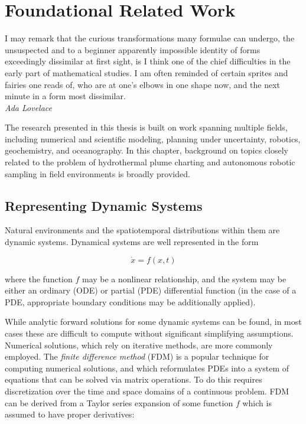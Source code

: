 \chapter{Foundational Related Work}
\label{chap:related_work}

\begin{center}
    \begin{minipage}{0.7\textwidth}
      \begin{small}
        I may remark that the curious transformations many formulae can undergo, the unsuspected and to a beginner apparently impossible identity of forms exceedingly dissimilar at first sight, is I think one of the chief difficulties in the early part of mathematical studies. I am often reminded of certain sprites and fairies one reads of, who are at one's elbows in one shape now, and the next minute in a form most dissimilar.\\ \emph{Ada Lovelace}
      \end{small}
    \end{minipage}
    \vspace{0.5cm}
\end{center}

The research presented in this thesis is built on work spanning multiple fields, including numerical and scientific modeling, planning under uncertainty, robotics, geochemistry, and oceanography. In this chapter, background on topics closely related to the problem of hydrothermal plume charting and autonomous robotic sampling in field environments is broadly provided.

\section{Representing Dynamic Systems}
\label{sec:dyn_sys}
Natural environments and the spatiotemporal distributions within them are dynamic systems.
Dynamical systems are well represented in the form

\begin{equation}
    \dot{x} = f(x,t)
\end{equation}

\noindent where the function $f$ may be a nonlinear relationship, and the system may be either an ordinary (ODE) or partial (PDE) differential function (in the case of a PDE, appropriate boundary conditions may be additionally applied).

While analytic forward solutions for some dynamic systems can be found, in most cases these are difficult to compute without significant simplifying assumptions. Numerical solutions, which rely on iterative methods, are more commonly employed. The \emph{finite difference method} \autocite{smith1985numerical} (FDM) is a popular technique for computing numerical solutions, and which reformulates PDEs into a system of equations that can be solved via matrix operations. To do this requires discretization over the time and space domains of a continuous problem. FDM can be derived from a Taylor series expansion of some function $f$ which is assumed to have proper derivatives:

